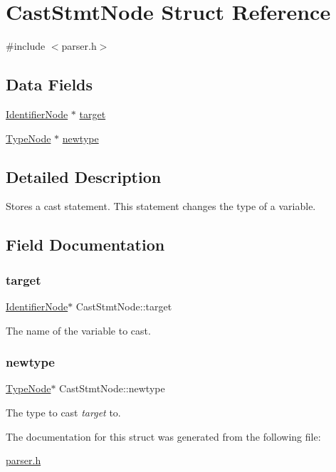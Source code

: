 \hypertarget{struct_cast_stmt_node}{}\section{Cast\+Stmt\+Node Struct Reference}
\label{struct_cast_stmt_node}


{\ttfamily \#include $<$parser.\+h$>$}

\subsection*{Data Fields}
\begin{DoxyCompactItemize}
\item 
\hyperlink{parser_8h_a930727769b8a8eb0d24d474f3aa12a43}{Identifier\+Node} $\ast$ \hyperlink{struct_cast_stmt_node_a89d56358f0a8fc4d4fb0df7029ea494e}{target}
\item 
\hyperlink{struct_type_node}{Type\+Node} $\ast$ \hyperlink{struct_cast_stmt_node_adbeebc6cefa4f2cb92079b82cb4f4df8}{newtype}
\end{DoxyCompactItemize}


\subsection{Detailed Description}
Stores a cast statement. This statement changes the type of a variable. 

\subsection{Field Documentation}
\mbox{\label{struct_cast_stmt_node_a89d56358f0a8fc4d4fb0df7029ea494e}} 
\subsubsection{\texorpdfstring{target}{target}}
{\footnotesize\ttfamily \hyperlink{parser_8h_a930727769b8a8eb0d24d474f3aa12a43}{Identifier\+Node}$\ast$ Cast\+Stmt\+Node\+::target}

The name of the variable to cast. \mbox{\label{struct_cast_stmt_node_adbeebc6cefa4f2cb92079b82cb4f4df8}} 
\subsubsection{\texorpdfstring{newtype}{newtype}}
{\footnotesize\ttfamily \hyperlink{struct_type_node}{Type\+Node}$\ast$ Cast\+Stmt\+Node\+::newtype}

The type to cast {\itshape target} to. 

The documentation for this struct was generated from the following file\+:\begin{DoxyCompactItemize}
\item 
\hyperlink{parser_8h}{parser.\+h}\end{DoxyCompactItemize}
